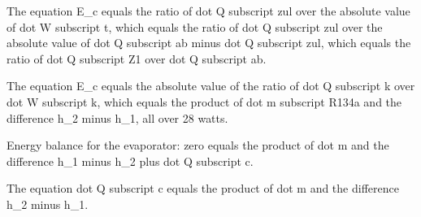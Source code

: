 The equation E_c equals the ratio of dot Q subscript zul over the absolute value of dot W subscript t, which equals the ratio of dot Q subscript zul over the absolute value of dot Q subscript ab minus dot Q subscript zul, which equals the ratio of dot Q subscript Z1 over dot Q subscript ab.

The equation E_c equals the absolute value of the ratio of dot Q subscript k over dot W subscript k, which equals the product of dot m subscript R134a and the difference h_2 minus h_1, all over 28 watts.

Energy balance for the evaporator: zero equals the product of dot m and the difference h_1 minus h_2 plus dot Q subscript c.

The equation dot Q subscript c equals the product of dot m and the difference h_2 minus h_1.
